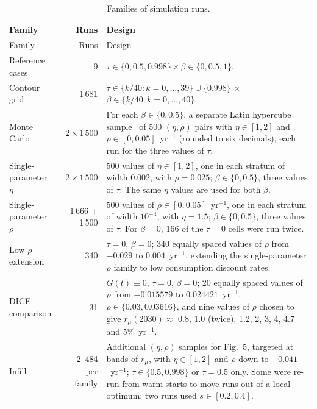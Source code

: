 \documentclass[11pt]{article}
\begin{document}
\begin{longtable}{p{} r p{}}
\caption{Families of simulation runs.}\label{tab:design}\\
\toprule
Family & Runs & Design \\
\midrule
\endfirsthead
\toprule
Family & Runs & Design \\
\midrule
\endhead
\bottomrule
\endfoot
Reference cases & 9 &
  $\tau\in\{0, 0.5, 0.998\}\times\beta\in\{0, 0.5, 1\}$. \\
Contour grid & 1\,681 &
  $\tau\in\{k/40: k = 0,\dots,39\}\cup\{0.998\}$ $\times$
  $\beta\in\{k/40: k = 0,\dots,40\}$. \\
Monte Carlo & $2\times1\,500$ &
  For each $\beta\in\{0, 0.5\}$, a separate Latin hypercube
  sample~\cite{McKay1979} of 500 $(\eta,\rho)$ pairs with
  $\eta\in[1,2]$ and $\rho\in[0, 0.05]$~yr$^{-1}$ (rounded to six decimals),
  each run for the three values of $\tau$. \\
Single-parameter $\eta$ & $2\times1\,500$ &
  500 values of $\eta\in[1,2]$, one in each stratum of width 0.002, with
  $\rho = 0.025$; $\beta\in\{0, 0.5\}$, three values of $\tau$. The same
  $\eta$ values are used for both $\beta$. \\
Single-parameter $\rho$ & 1\,666 + 1\,500 &
  500 values of $\rho\in[0, 0.05]$~yr$^{-1}$, one in each stratum of width
  $10^{-4}$, with $\eta = 1.5$; $\beta\in\{0, 0.5\}$, three values of $\tau$.
  For $\beta = 0$, 166 of the $\tau = 0$ cells were run twice. \\
Low-$\rho$ extension & 340 &
  $\tau = 0$, $\beta = 0$; 340 equally spaced values of $\rho$ from $-0.029$
  to $0.004$~yr$^{-1}$, extending the single-parameter $\rho$ family to low
  consumption discount rates. \\
DICE comparison & 31 &
  $G(t)\equiv0$, $\tau = 0$, $\beta = 0$; 20 equally spaced values of $\rho$
  from $-0.015579$ to $0.024421$~yr$^{-1}$, $\rho\in\{0.03, 0.03616\}$, and
  nine values of $\rho$ chosen to give $r_\mu(2030)\approx$ 0.8, 1.0 (twice),
  1.2, 2, 3, 4, 4.7 and 5\%~yr$^{-1}$. \\
Infill & 2--484 per family &
  Additional $(\eta,\rho)$ samples for Fig.~5, targeted at bands of $r_\mu$,
  with $\eta\in[1,2]$ and $\rho$ down to $-0.041$~yr$^{-1}$; $\tau\in\{0.5,
  0.998\}$ or $\tau = 0.5$ only. Some were re-run from warm starts to move
  runs out of a local optimum; two runs used $s\in[0.2, 0.4]$. \\
\end{longtable}
\end{document}
